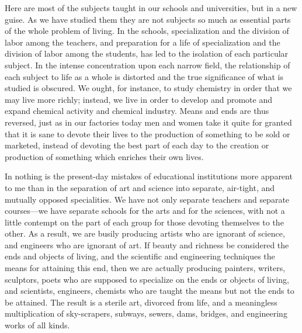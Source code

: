 \documentclass{book}
\begin{document}
Here are most of the subjects taught in our schools and universities, but in a new guise. As we have studied them they are not subjects so much as essential parts of the whole problem of living. In the schools, specialization and the division of labor among the teachers, and preparation for a life of specialization and the division of labor among the students, has led to the isolation of each particular subject. In the intense concentration upon each narrow field, the relationship of each subject to life as a whole is distorted and the true significance of what is studied is obscured. We ought, for instance, to study chemistry in order that we may live more richly; instead, we live in order to develop and promote and expand chemical activity and chemical industry. Means and ends are thus reversed, just as in our factories today men and women take it quite for granted that it is sane to devote their lives to the production of something to be sold or marketed, instead of devoting the best part of each day to the creation or production of something which enriches their own lives.

In nothing is the present-day mistakes of educational institutions more apparent to me than in the separation of art and science into separate, air-tight, and mutually opposed specialities. We have not only separate teachers and separate courses—we have separate schools for the arts and for the sciences, with not a little contempt on the part of each group for those devoting themselves to the other. As a result, we are busily producing artists who are ignorant of science, and engineers who are ignorant of art. If beauty and richness be considered the ends and objects of living, and the scientific and engineering techniques the means for attaining this end, then we are actually producing painters, writers, sculptors, poets who are supposed to specialize on the ends or objects of living, and scientists, engineers, chemists who are taught the means but not the ends to be attained. The result is a sterile art, divorced from life, and a meaningless multiplication of sky-scrapers, subways, sewers, dams, bridges, and engineering works of all kinds.
\end{document}
